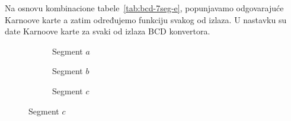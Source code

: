 \documentclass[a4paper,11pt]{article}
\numberwithin{equation}{section} %
\begin{document}
Na osnovu kombinacione tabele~\ref{tab:bcd-7seg-e}, popunjavamo odgovarajuće Karnoove karte a zatim određujemo funkciju svakog od izlaza. U nastavku su date Karnoove karte za svaki od izlaza BCD konvertora.


\begin{figure}[!ht]
  \centering


  \begin{subfigure}{0.32\textwidth}
    \centering
    \captionsetup{skip=-1em} %
    \caption{Segment $a$}
    \label{fig:kmap-a}
  \end{subfigure}
  \hfill
  \begin{subfigure}{0.32\textwidth}
    \centering
    \captionsetup{skip=-1em} %
    \caption{Segment $b$}
    \label{fig:kmap-b}
  \end{subfigure}
  \hfill
  \begin{subfigure}{0.32\textwidth}
    \centering
    \captionsetup{skip=-1em} %
    \caption{Segment $c$}
    \label{fig:kmap-c}
  \end{subfigure}

  \vspace{1em}


\end{figure}
\end{document}
